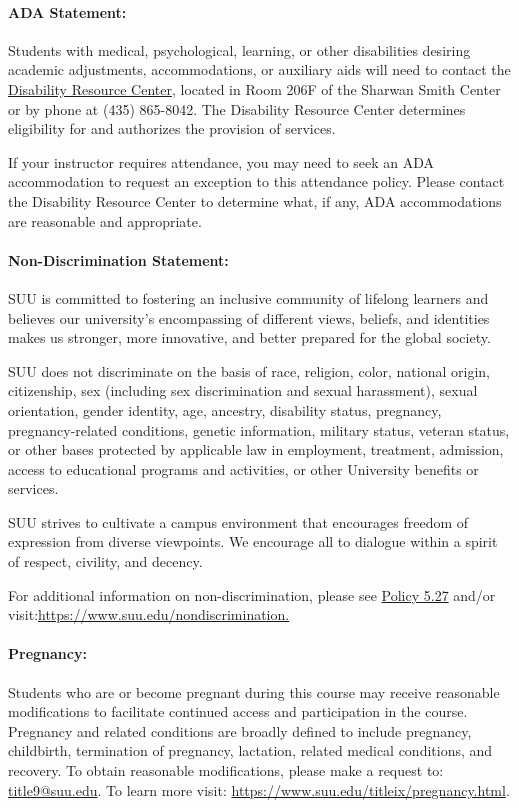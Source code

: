 \documentclass[12pt, letterpaper]{article}
\begin{document}
\paragraph{ADA Statement:}
Students with medical, psychological, learning, or other disabilities desiring academic adjustments, accommodations, or auxiliary aids will need to contact the \href{https://www.suu.edu/disabilityservices/}{Disability Resource Center}, located in Room 206F of the Sharwan Smith Center or by phone at (435) 865-8042. The Disability Resource Center determines eligibility for and authorizes the provision of services.

\noindent
If your instructor requires attendance, you may need to seek an ADA accommodation to request an exception to this attendance policy. Please contact the Disability Resource Center to determine what, if any, ADA accommodations are reasonable and appropriate.

\paragraph{Non-Discrimination Statement:}
SUU is committed to fostering an inclusive community of lifelong learners and believes our university's encompassing of different views, beliefs, and identities makes us stronger, more innovative, and better prepared for the global society. 

\noindent
SUU does not discriminate on the basis of race, religion, color, national origin, citizenship, sex (including sex discrimination and sexual harassment), sexual orientation, gender identity, age, ancestry, disability status, pregnancy, pregnancy-related conditions, genetic information, military status, veteran status, or other bases protected by applicable law in employment, treatment, admission, access to educational programs and activities, or other University benefits or services.

\noindent
SUU strives to cultivate a campus environment that encourages freedom of expression from diverse viewpoints. We encourage all to dialogue within a spirit of respect, civility, and decency. 

\noindent
For additional information on non-discrimination, please see \href{https://www.suu.edu/policies/05/27.html}{Policy 5.27} and/or visit:\newline \href{https://www.suu.edu/nondiscrimination.}{https://www.suu.edu/nondiscrimination.}

\paragraph{Pregnancy:}
Students who are or become pregnant during this course may receive reasonable modifications to facilitate continued access and participation in the course. Pregnancy and related conditions are broadly defined to include pregnancy, childbirth, termination of pregnancy, lactation, related medical conditions, and recovery. To obtain reasonable modifications, please make a request to: \href{mailto:title9@suu.edu}{title9@suu.edu}. To learn more visit: \href{https://www.suu.edu/titleix/pregnancy.html}{https://www.suu.edu/titleix/pregnancy.html}.
\end{document}
